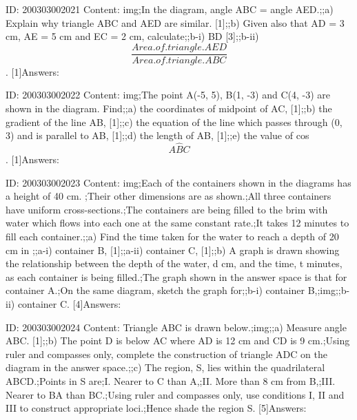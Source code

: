 \documentclass{article}
\begin{document}
ID: 200303002021
Content:
img;In the diagram, angle ABC = angle AED.;;a) Explain why triangle ABC and AED are similar.   [1];;b) Given also that AD = 3 cm, AE = 5 cm and EC = 2 cm, calculate;;b-i) BD   [3];;b-ii) $$\frac{Area.of.triangle.AED}{Area.of.triangle.ABC}$$.   [1]Answers:

ID: 200303002022
Content:
img;The point A(-5, 5), B(1, -3) and C(4, -3) are shown in the diagram. Find;;a) the coordinates of midpoint of AC,   [1];;b) the gradient of the line AB,   [1];;c) the equation of the line which passes through (0, 3) and is parallel to AB,   [1];;d) the length of AB,   [1];;e) the value of cos $$A \hat BC$$.   [1]Answers:

ID: 200303002023
Content:
img;Each of the containers shown in the diagrams has a height of 40 cm. ;Their other dimensions are as shown.;All three containers have uniform cross-sections.;The containers are being filled to the brim with water which flows into each one at the same constant rate.;It takes 12 minutes to fill each container.;;a) Find the time taken for the water to reach a depth of 20 cm in ;;a-i) container B,   [1];;a-ii) container C,   [1];;b) A graph is drawn showing the relationship between the depth of the water, d cm, and the time, t minutes, as each container is being filled.;The graph shown in the answer space is that for container A.;On the same diagram, sketch the graph for;;b-i) container B,;img;;b-ii) container C.   [4]Answers:

ID: 200303002024
Content:
Triangle ABC is drawn below.;img;;a) Measure angle ABC.   [1];;b) The point D is below AC where AD is 12 cm and CD is 9 cm.;Using ruler and compasses only, complete the construction of triangle ADC on the diagram in the answer space.;;c) The region, S, lies within the quadrilateral ABCD.;Points in S are;I.	Nearer to C than A,;II.	More than 8 cm from B,;III.	Nearer to BA than BC.;Using ruler and compasses only, use conditions I, II and III to construct appropriate loci.;Hence shade the region S.   [5]Answers:
\end{document}
